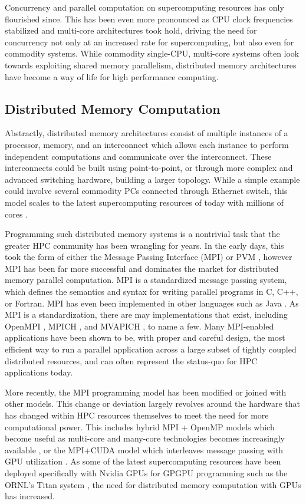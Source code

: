 Concurrency and parallel computation on supercomputing resources has only flourished since. This has been even more pronounced as CPU clock frequencies stabilized and multi-core architectures took hold, driving the need for concurrency not only at an increased rate for supercomputing, but also even for commodity systems.   While commodity single-CPU, multi-core systems often look towards exploiting shared memory parallelism, distributed memory architectures have become a way of life for high performance computing. 

\subsection{Distributed Memory Computation}

Abstractly,  distributed memory architectures consist of multiple instances of a processor, memory, and an interconnect which allows each instance to perform independent computations and communicate over the interconnect. These interconnects could be built using point-to-point, or through more complex and advanced switching hardware, building a larger topology.  While a simple example could involve several commodity PCs connected through Ethernet switch, this model scales to the latest supercomputing resources of today with millions of cores \cite{zhang2014optimizing}.  

Programming such distributed memory systems is a nontrivial task that the greater HPC community has been wrangling for years. In the early days, this took the form of either the Message Passing Interface (MPI) \cite{mpi} or PVM \cite{geist1994pvm}, however MPI has been far more successful and dominates the market for distributed memory parallel computation. MPI is a standardized message passing system, which defines the semantics and syntax for writing parallel programs in C, C++, or Fortran. MPI has even been implemented in other languages such as Java \cite{carpenter2000mpj}.  As MPI is a standardization, there are may implementations that exist, including OpenMPI \cite{gabriel2004open}, MPICH \cite{gropp1999using}, and MVAPICH \cite{koop2008mvapich}, to name a few. Many MPI-enabled applications have been shown to be, with proper and careful design, the most efficient way to run a parallel application across a large subset of tightly coupled distributed resources, and can often represent the status-quo for HPC applications today. 

More recently, the MPI programming model has been modified or joined with other models. This change or deviation largely revolves around the hardware that has changed within HPC resources themselves to meet the need for more computational power. This includes hybrid MPI + OpenMP models which become useful as multi-core and many-core technologies becomes increasingly available \cite{rabenseifner2009hybrid}, or the MPI+CUDA model which interleaves message passing with GPU utilization \cite{jacobsen2010mpi}.  As some of the latest supercomputing resources have been deployed specifically with Nvidia GPUs for GPGPU programming such as the ORNL's Titan system \cite{bland2012titan}, the need for distributed memory computation with GPUs has increased.  

